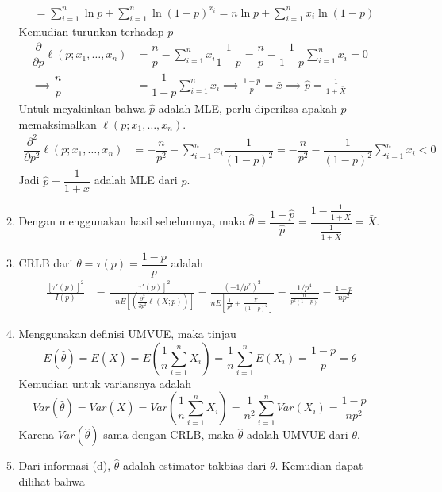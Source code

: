 \documentclass{exam}
\newcommand{\del}{\partial}
\begin{document}
\begin{enumerate}
\begin{solution}
\begin{enumerate}
\begin{align*}
                &= \sum_{i=1}^n \ln p + \sum_{i=1}^n \ln(1-p)^{x_i} = n\ln p + \sum_{i=1}^n x_i\ln(1-p)
            \end{align*}
            Kemudian turunkan terhadap $p$ 
            \begin{align*}
                \dfrac{\del}{\del p}\ell(p; x_1,\dots,x_n) &= \dfrac{n}{p} - \sum_{i=1}^n x_i\dfrac{1}{1-p} = \dfrac{n}{p} - \dfrac{1}{1-p}\sum_{i=1}^n x_i = 0\\
                \implies \dfrac{n}{p} &= \dfrac{1}{1-p}\sum_{i=1}^n x_i \implies \frac{1-p}{p} = \bar{x} \implies \hat{p} = \frac{1}{1+\bar{X}} 
            \end{align*}
            Untuk meyakinkan bahwa $\hat{p}$ adalah MLE, perlu diperiksa apakah $\hat{p}$ memaksimalkan $\ell(p; x_1,\dots,x_n)$.
            \begin{align*}
                \dfrac{\del^2}{\del p^2}\ell(p; x_1,\dots,x_n) &= -\dfrac{n}{p^2} - \sum_{i=1}^n x_i\dfrac{1}{(1-p)^2} = -\dfrac{n}{p^2} - \dfrac{1}{(1-p)^2}\sum_{i=1}^n x_i < 0
            \end{align*}
            Jadi $\hat{p}=\dfrac{1}{1+\bar{x}}$ adalah MLE dari $p$.
            \item Dengan menggunakan hasil sebelumnya, maka $\hat{\theta} = \dfrac{1-\hat{p}}{\hat{p}} = \dfrac{1-\frac{1}{1+\bar{X}}}{\frac{1}{1+\bar{X}}} = \bar{X}$.
            \item CRLB dari $\theta=\tau(p)=\dfrac{1-p}{p}$ adalah
            \begin{align*}
                \frac{[\tau'(p)]^2}{I(p)} &= \frac{[\tau'(p)]^2}{-nE\left[\left(\frac{\del^2}{\del p^2}\ell(X;p)\right)\right]} = \frac{(-1/p^2)^2}{nE\left[\frac{1}{p^2} + \frac{X}{(1-p)^2}\right]}=\frac{1/p^4}{\frac{n}{p^2(1-p)}}=\frac{1-p}{np^2}
            \end{align*}
            \item Menggunakan definisi UMVUE, maka tinjau 
            \[E(\hat{\theta}) = E(\bar{X}) = E\left(\frac{1}{n}\sum_{i=1}^{n}X_i\right) = \frac{1}{n}\sum_{i=1}^{n}E(X_i) = \frac{1-p}{p} = \theta\]
            Kemudian untuk variansnya adalah
            \[Var(\hat{\theta}) = Var(\bar{X}) = Var\left(\frac{1}{n}\sum_{i=1}^{n}X_i\right) = \frac{1}{n^2}\sum_{i=1}^{n}Var(X_i) = \frac{1-p}{np^2}\]
            Karena $Var(\hat{\theta})$ sama dengan CRLB, maka $\hat{\theta}$ adalah UMVUE dari $\theta$.
            \item Dari informasi (d), $\hat{\theta}$ adalah estimator takbias dari $\theta$. Kemudian dapat dilihat bahwa

\end{enumerate}
\end{solution}
\end{enumerate}
\end{document}
